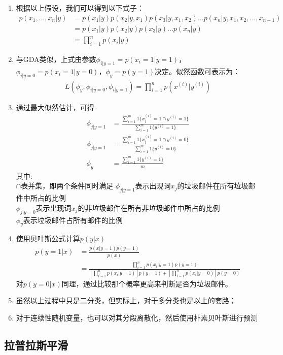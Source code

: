 \begin{enumerate}
\begin{enumerate}
		\item 根据以上假设，我们可以得到以下式子：
		\begin{align}
			p(x_1, \dots, x_n|y) &= p(x_1|y)p(x_2|y, x_1)p(x_3|y, x_1, x_2)\dots p(x_n|y, x_1, x_2, \dots, x_{n-1}) \\
			&= p(x_1|y)p(x_2|y)p(x_3|y)\dots p(x_n|y) \\
			&= \prod_{i=1}^{n}p(x_i|y)
		\end{align}
		\item 与GDA类似，上式由参数$\phi_{i|y=1}=p(x_i=1|y=1)$，$\phi_{i|y=0}=p(x_i=1|y=0)$，$\phi_y=p(y=1)$决定。似然函数可表示为：
		\begin{align}
			L(\phi_y, \phi_{i|y=0}, \phi_{i|y=1}) = \prod_{i=1}^{n}p(x^{(i)}|y^{(i)})
		\end{align}
		\item 通过最大似然估计，可得
		\begin{align}
			\phi_{j|y=1} &= \frac{\sum_{i=1}^{m}1\{x_j^{(i)}=1 \cap y^{(i)}=1\}}{\sum_{i=1}^{m}1\{y^{(i)}=1\}} \\
			\phi_{j|y=1} &= \frac{\sum_{i=1}^{m}1\{x_j^{(i)}=1 \cap y^{(i)}=0\}}{\sum_{i=1}^{m}1\{y^{(i)}=0\}} \\
			\phi_y &= \frac{\sum_{i=1}^{m}1\{y^{(i)}=1\}}{m}
		\end{align}
		其中: \\
		$\cap$表并集，即两个条件同时满足
		$\phi_{j|y=1}$表示出现词$x_j$的垃圾邮件在所有垃圾邮件中所占的比例 \\
		$\phi_{j|y=0}$表示出现词$x_j$的非垃圾邮件在所有非垃圾邮件中所占的比例 \\
		$\phi_y$表示垃圾邮件占所有邮件的比例
		\item 使用贝叶斯公式计算$p(y|x)$
		\begin{align}
			p(y=1|x) &= \frac{p(x|y=1)p(y=1)}{p(x)} \\
			&= \frac{\prod_{i=1}^{n}p(x_i|y=1)p(y=1)}{\left[\prod_{i=1}^{n}p(x_i|y=1)\right]p(y=1)+\left[\prod_{i=1}^{n}p(x_i|y=0)\right]p(y=0)}
		\end{align}
		对$p(y=0|x)$同理，通过比较那个概率更高来判断是否为垃圾邮件。
		\item 虽然以上过程中只是二分类，但实际上，对于多分类也是以上的套路；
		\item 对于连续性随机变量，也可以对其分段离散化，然后使用朴素贝叶斯进行预测
	\end{enumerate}
\end{enumerate}

\subsection{拉普拉斯平滑}
